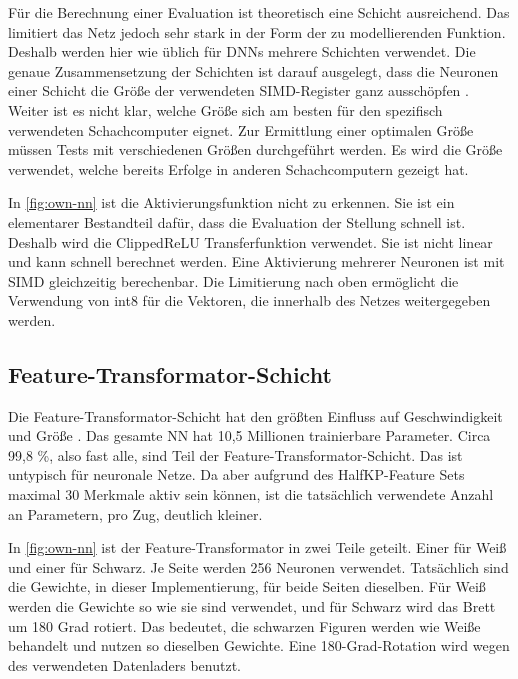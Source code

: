Für die Berechnung einer Evaluation ist theoretisch eine Schicht ausreichend. Das limitiert das Netz jedoch sehr stark in der Form der zu modellierenden Funktion. Deshalb werden hier wie üblich für \acp{DNN} mehrere Schichten verwendet. Die genaue Zusammensetzung der Schichten ist darauf ausgelegt, dass die Neuronen einer Schicht die Größe der verwendeten \ac{SIMD}-Register ganz ausschöpfen \cite{YNasu2018}. Weiter ist es nicht klar, welche Größe sich am besten für den spezifisch verwendeten Schachcomputer eignet. Zur Ermittlung einer optimalen Größe müssen Tests mit verschiedenen Größen durchgeführt werden. Es wird die Größe verwendet, welche bereits Erfolge in anderen Schachcomputern gezeigt hat.

In \autoref{fig:own-nn} ist die Aktivierungsfunktion nicht zu erkennen. Sie ist ein elementarer Bestandteil dafür, dass die Evaluation der Stellung schnell ist. Deshalb wird die Clipped\ac{ReLU} Transferfunktion verwendet. Sie ist nicht linear und kann schnell berechnet werden. Eine Aktivierung mehrerer Neuronen ist mit \ac{SIMD} gleichzeitig berechenbar. Die Limitierung nach oben ermöglicht die Verwendung von int8 für die Vektoren, die innerhalb des Netzes weitergegeben werden.

\subsection{Feature-Transformator-Schicht}

Die Feature-Transformator-Schicht hat den größten Einfluss auf Geschwindigkeit und Größe \cite{StockfishNNUE}. Das gesamte \ac{NN} hat 10,5 Millionen trainierbare Parameter. Circa 99,8 \%, also fast alle, sind Teil der Feature-Transformator-Schicht. Das ist untypisch für neuronale Netze. Da aber aufgrund des HalfKP-Feature Sets maximal 30 Merkmale aktiv sein können, ist die tatsächlich verwendete Anzahl an Parametern, pro Zug, deutlich kleiner.

In \autoref{fig:own-nn} ist der Feature-Transformator in zwei Teile geteilt. Einer für Weiß und einer für Schwarz. Je Seite werden 256 Neuronen verwendet. Tatsächlich sind die Gewichte, in dieser Implementierung, für beide Seiten dieselben. Für Weiß werden die Gewichte so wie sie sind verwendet, und für Schwarz wird das Brett um 180 Grad rotiert. Das bedeutet, die schwarzen Figuren werden wie Weiße behandelt und nutzen so dieselben Gewichte. Eine 180-Grad-Rotation wird wegen des verwendeten Datenladers benutzt.

